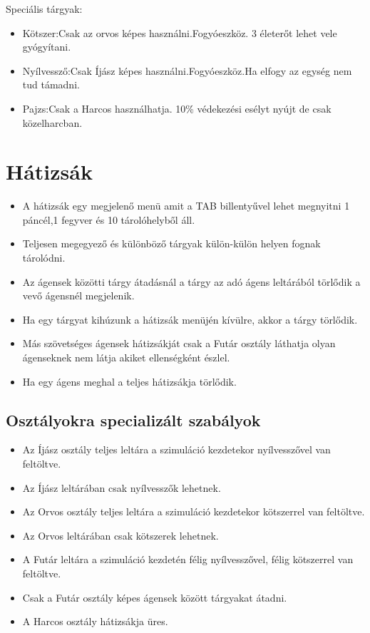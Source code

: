 Speciális tárgyak:
\begin{itemize}
  \item Kötszer:Csak az orvos képes használni.Fogyóeszköz. 3 életerőt lehet vele gyógyítani.
  \item Nyílvessző:Csak Íjász képes használni.Fogyóeszköz.Ha elfogy az egység nem tud támadni.
  \item Pajzs:Csak a Harcos használhatja. 10\% védekezési esélyt nyújt de csak közelharcban.
\end{itemize}
    
\section{Hátizsák}

\begin{itemize}
  \item A hátizsák egy megjelenő menü amit a TAB billentyűvel lehet megnyitni 1 páncél,1 fegyver és 10 tárolóhelyből áll.
  \item Teljesen megegyező és különböző tárgyak külön-külön helyen fognak tárolódni.
  \item Az ágensek közötti tárgy átadásnál a tárgy az adó ágens leltárából törlődik a vevő ágensnél megjelenik.
  \item Ha egy tárgyat kihúzunk a hátizsák menüjén kívülre, akkor a tárgy törlődik.
  \item Más szövetséges ágensek hátizsákját csak a Futár osztály láthatja olyan ágenseknek nem látja akiket ellenségként észlel.
  \item Ha egy ágens meghal a teljes hátizsákja törlődik.
  
\end{itemize}

\subsection{Osztályokra specializált szabályok}
\begin{itemize}
  \item Az Íjász osztály teljes leltára a szimuláció kezdetekor  nyílvesszővel van feltöltve.
  \item Az Íjász leltárában csak nyílvesszők lehetnek.
  \item Az Orvos osztály teljes leltára a szimuláció kezdetekor kötszerrel van feltöltve.
  \item Az Orvos leltárában csak kötszerek lehetnek.
  \item A Futár leltára a szimuláció kezdetén félig nyílvesszővel, félig kötszerrel van feltöltve.
  \item Csak a Futár osztály képes ágensek között tárgyakat átadni.
  \item A Harcos osztály hátizsákja üres.
  
\end{itemize}












